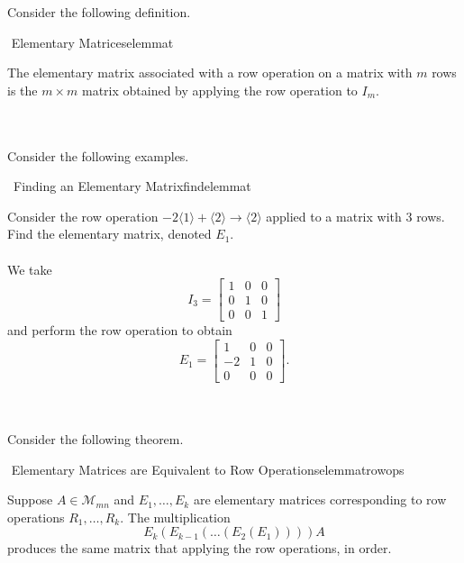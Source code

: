         Consider the following definition.
        \begin{definition}{\Stop\,\,Elementary Matrices}{elemmat}

            The elementary matrix associated with a row operation on a matrix with \(m\) rows is the \(m\times m\) matrix obtained by applying the row operation to \(I_m\).
            
        \end{definition}
        \vphantom
        \\
        \\
        Consider the following examples.
        \begin{example}{\Difficulty\,\Difficulty\,\,Finding an Elementary Matrix}{findelemmat}
            
            Consider the row operation \(-2\langle1\rangle+\langle2\rangle\to\langle2\rangle\) applied to a matrix with \(3\) rows. Find the elementary matrix, denoted \(E_1\).
            \\
            \\
            We take 
            \begin{equation*}
                I_3=\begin{bmatrix}
                    1 & 0 & 0 \\
                    0 & 1 & 0 \\
                    0 & 0 & 1
                \end{bmatrix}
            \end{equation*}
            and perform the row operation to obtain
            \begin{equation*}
                E_1=\begin{bmatrix}
                    1 & 0 & 0 \\
                    -2 & 1 & 0 \\
                    0 & 0 & 0
                \end{bmatrix}.
            \end{equation*}
        \end{example}
        \vphantom
        \\
        \\
        Consider the following theorem.
        \begin{theorem}{\Stop\,\,Elementary Matrices are Equivalent to Row Operations}{elemmatrowops}

            Suppose \(A\in\mathcal{M}_{mn}\) and \(E_1,\ldots,E_k\) are elementary matrices corresponding to row operations \(R_1,\ldots,R_k\). The multiplication
            \begin{equation*}
                E_k(E_{k-1}(\ldots(E_2(E_1))))A
            \end{equation*}
            produces the same matrix that applying the row operations, in order.
            
        \end{theorem}